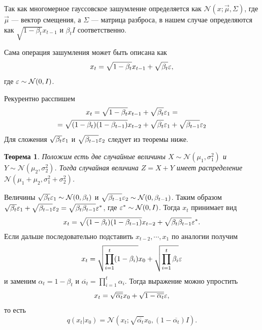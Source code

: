 \documentclass[11pt, a4paper, twocolumn, twoside]{article} %
\newtheorem{theorem}{Теорема}[section]
\begin{document}
Так как многомерное гауссовское зашумление определяется как $\mathcal{N}(x; \vec\mu, \Sigma)$, где $\vec\mu$ — вектор смещения, а $\Sigma$ — матрица разброса, в нашем случае определяются как $\sqrt{1-\beta_t}x_{t-1}$ и $\beta_t I$ соответственно.

Сама операция зашумления может быть описана как
\begin{equation}
	x_t = \sqrt{1-\beta_t}x_{t-1} + \sqrt{\beta_t}\varepsilon,
\end{equation}
где $\varepsilon\sim\mathcal{N}(0, I)$.

Рекурентно расспишем
\begin{multline}
	x_t = \sqrt{1-\beta_t}x_{t-1} + \sqrt{\beta_t}\varepsilon_1 = \\ = \sqrt{(1-\beta_t)(1-\beta_{t-1})}x_{t-2} + \sqrt{\beta_t}\varepsilon_1 + \sqrt{\beta_{t-1}}\varepsilon_2
\end{multline}
Для сложения $\sqrt{\beta_t}\varepsilon_1$ и $\sqrt{\beta_{t-1}}\varepsilon_2$ следует из теоремы ниже.
\begin{theorem}
	Положим есть две случайные величины $X\sim\mathcal{N}(\mu_1, \sigma^2_1)$ и $Y\sim\mathcal{N}(\mu_2, \sigma^2_2)$. Тогда случайная величина $Z=X+Y$ имеет распределение $\mathcal{N}(\mu_1 + \mu_2, \sigma^2_1+\sigma^2_2)$.
\end{theorem}
Величины $\sqrt{\beta_t}\varepsilon_1\sim\mathcal{N}(0, \beta_t)$ и $\sqrt{\beta_{t-1}}\varepsilon_2\sim\mathcal{N}(0, \beta_{t-1})$. Таким образом $\sqrt{\beta_t}\varepsilon_1 + \sqrt{\beta_{t-1}}\varepsilon_2 = \sqrt{\beta_t\beta_{t-1}} \varepsilon^*$, где $\varepsilon^*\sim\mathcal{N}(0, I)$. Тогда $x_t$ принимает вид
\begin{multline}
	x_t = \sqrt{(1-\beta_t)(1-\beta_{t-1})}x_{t-2} + \sqrt{\beta_t\beta_{t-1}} \varepsilon^*.
\end{multline}
Если дальше последовательно подставить $x_{t-2},\cdots, x_1$ по аналогии получим
\begin{equation*}
	x_t = \sqrt{\prod\limits_{i=1}^{t}(1-\beta_i)}x_0 + \sqrt{\prod\limits_{i=1}^{t}\beta_i} \varepsilon
\end{equation*}
и заменим $\alpha_t=1-\beta_t$ и $\overline{\alpha_t} = \prod_{i=1}^t \alpha_i$. Тогда выражение можно упростить
\begin{equation}
	x_t = \sqrt{\overline{\alpha_t}}x_0 + \sqrt{1-\overline{\alpha_t}} \varepsilon,
\end{equation}
то есть
\begin{equation}
	q(x_t|x_0) = \mathcal{N}(x_t; \sqrt{\overline{\alpha_t}}x_0, (1-\overline{\alpha_t})I).
\end{equation}
\end{document}
